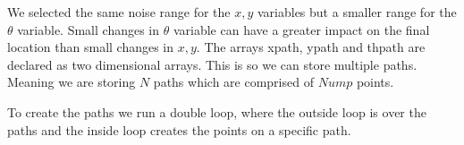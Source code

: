 We selected the same noise range for the \(x,y\) variables but a smaller
range for the \(\theta\) variable. Small changes in \(\theta\) variable
can have a greater impact on the final location than small changes in
\(x,y\). The arrays xpath, ypath and thpath are declared as two
dimensional arrays. This is so we can store multiple paths. Meaning we
are storing \(N\) paths which are comprised of \(Nump\) points.

To create the paths we run a double loop, where the outside loop is over
the paths and the inside loop creates the points on a specific path.

\hypertarget{lst:generatepoints}{%
\label{lst:generatepoints}}%
\begin{Shaded}
\begin{Highlighting}[]
\OperatorTok{=} \OperatorTok{:}
\OperatorTok{=} 
\OperatorTok{=} 
\OperatorTok{=} 
\OperatorTok{=}\OperatorTok{,}
\OperatorTok{=}\OperatorTok{,}
\OperatorTok{=}\OperatorTok{,}
    \OperatorTok{=} \OperatorTok{:}
\OperatorTok{,}\OperatorTok{=}
\OperatorTok{=}\OperatorTok{*}\OperatorTok{/}\NormalTok{)}\OperatorTok{*}\OperatorTok{+}\OperatorTok{*}\OperatorTok{+}
\OperatorTok{=}\OperatorTok{*}\OperatorTok{/}\NormalTok{)}\OperatorTok{*}\OperatorTok{+}\OperatorTok{*}\OperatorTok{+}
\OperatorTok{=}\OperatorTok{*}\OperatorTok{/}\NormalTok{(}\OperatorTok{*}\OperatorTok{*}\OperatorTok{{-}}\OperatorTok{+}
\OperatorTok{=}\OperatorTok{+}
\OperatorTok{=}\OperatorTok{+}
\OperatorTok{=}\OperatorTok{+}
\NormalTok{        xpath[k}\OperatorTok{,}\NormalTok{i] }\OperatorTok{=}
\NormalTok{        ypath[k}\OperatorTok{,}\NormalTok{i] }\OperatorTok{=}
\NormalTok{        thpath[k}\OperatorTok{,}\NormalTok{i] }\OperatorTok{=}
\end{Highlighting}
\end{Shaded}

